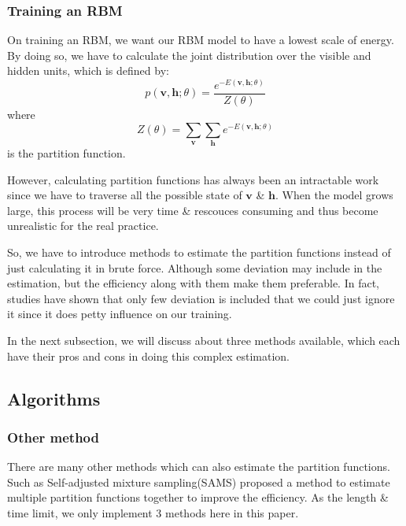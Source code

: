 \subsubsection{Training an RBM}
On training an RBM, we want our RBM model to have a lowest scale of energy. By doing so, we have to calculate the joint distribution over the visible and hidden units, which is defined by:
\begin{equation}
	p(\mathbf v,\mathbf h;\theta)=\frac{e^{-E(\mathbf v,\mathbf h;\theta)}}{Z(\theta)}
\end{equation}
where
\begin{equation}
	Z(\theta)=\sum_{\mathbf v} \sum_{\mathbf h} e^{-E(\mathbf v,\mathbf h;\theta)}
\end{equation}
is the partition function.

However, calculating partition functions has always been an intractable work since we have to traverse all the possible state of $\mathbf v$ \& $\mathbf h$.
When the model grows large, this process will be very time \& rescouces consuming and thus become unrealistic for the real practice.

So, we have to introduce methods to estimate the partition functions instead of just calculating it in brute force. Although some deviation may include in the estimation, but the efficiency along with them make them preferable. In fact, studies have shown that only few deviation is included that we could just ignore it since it does petty influence on our training.

In the next subsection, we will discuss about three methods available, which each have their pros and cons in doing this complex estimation.



\subsection{Algorithms}





\subsubsection{Other method}
There are many other methods which can also estimate the partition functions. Such as Self-adjusted mixture sampling(SAMS)\cite{tan2015optimally} proposed a method to estimate multiple partition functions together to improve the efficiency. As the length \& time limit, we only implement 3 methods here in this paper.


